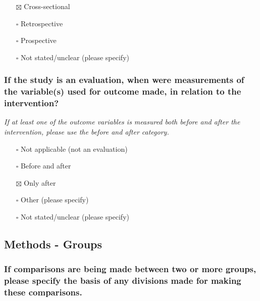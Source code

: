 \documentclass[
  doc, a4paper]{apa7}
\providecommand{\tightlist}{%
  \setlength{\itemsep}{0pt}\setlength{\parskip}{0pt}}
\begin{document}
\begin{itemize}
\tightlist
\item[$\boxtimes$]
  Cross-sectional\\
\item[$\square$]
  Retrospective\\
\item[$\square$]
  Prospective\\
\item[$\square$]
  Not stated/unclear (please specify)
\end{itemize}

\subsubsection{If the study is an evaluation, when were measurements of the variable(s) used for outcome made, in relation to the intervention?}\label{if-the-study-is-an-evaluation-when-were-measurements-of-the-variables-used-for-outcome-made-in-relation-to-the-intervention}

\emph{If at least one of the outcome variables is measured both before and after the intervention, please use the before and after category.}

\begin{itemize}
\tightlist
\item[$\square$]
  Not applicable (not an evaluation)\\
\item[$\square$]
  Before and after\\
\item[$\boxtimes$]
  Only after\\
\item[$\square$]
  Other (please specify)\\
\item[$\square$]
  Not stated/unclear (please specify)
\end{itemize}

\subsection{Methods - Groups}\label{methods---groups}

\subsubsection{If comparisons are being made between two or more groups, please specify the basis of any divisions made for making these comparisons.}\label{if-comparisons-are-being-made-between-two-or-more-groups-please-specify-the-basis-of-any-divisions-made-for-making-these-comparisons.}
\end{document}
